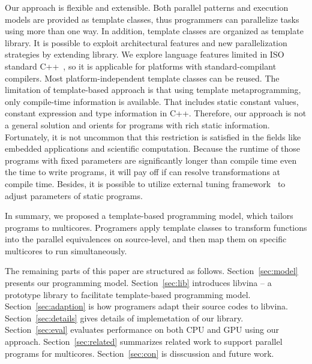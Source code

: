 Our approach is flexible and extensible. Both parallel patterns and
execution models are provided as template classes, thus programmers can
parallelize tasks using more than one way. In addition, template
classes are organized as template library. It is
possible to exploit architectural
features and new parallelization strategies by extending library. We
explore language features limited in ISO
standard C++~\cite{c++98, c++03, c++0x}, so it is applicable for
platforms with standard-compilant compilers. Most 
platform-independent template classes can be reused. The limitation of
template-based approach is that using template metaprogramming, only compile-time
information is available. That includes static constant values,
constant expression and type information in C++. Therefore, our
approach is not a general solution and orients for programs with rich
static information. Fortunately, it is not uncommon that this
restriction is satisfied in the fields like embedded applications and
scientific computation. Because the runtime of those programs with fixed
parameters are significantly longer than compile time even the time to
write programs, it will pay off if can resolve transformations at
compile time. Besides, it is possible to utilize external
tuning framework~\cite{tuningfrm} to adjust parameters of static programs.

In summary, we proposed a template-based programming model, which 
tailors programs to multicores. Programers apply template classes to
transform functions into the parallel equivalences on source-level,
and then map them on specific multicores to run simultaneously.

The remaining parts of this paper are structured as follows.
Section~\ref{sec:model} presents our programming model. Section~\ref{sec:lib} introduces libvina
-- a prototype library to facilitate template-based programming model.
Section~\ref{sec:adaption} is how programers adapt their source codes to libvina. Section~\ref{sec:details} gives details of
implemetation of our library. Section~\ref{sec:eval}
evaluates performance on both CPU and GPU using our approach.
Section~\ref{sec:related} summarizes related work to support parallel programs
for multicores. Section~\ref{sec:con} is disscussion and future work.


